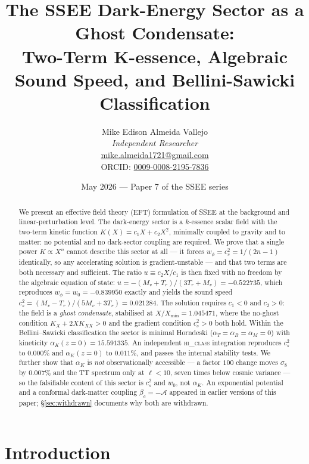 \documentclass[12pt,a4paper]{article}
\title{\textbf{The SSEE Dark-Energy Sector as a Ghost Condensate:\\
       Two-Term K-essence, Algebraic Sound Speed, and Bellini-Sawicki
       Classification}}
\author{Mike Edison Almeida Vallejo \\
\small \textit{Independent Researcher} \\
\small \href{mailto:mike.almeida1721@gmail.com}{mike.almeida1721@gmail.com} \\
\small ORCID: \href{https://orcid.org/0009-0008-2195-7836}{0009-0008-2195-7836}
}
\date{May 2026 --- Paper 7 of the SSEE series}
\newcommand{\AURA}{\mathcal{A}}
\newcommand{\bc}{\beta_c}
\begin{document}
\maketitle

\begin{abstract}
We present an effective field theory (EFT) formulation of SSEE at the
background and linear-perturbation level.
The dark-energy sector is a $k$-essence scalar field with the two-term
kinetic function $K(X) = c_1 X + c_2 X^2$, minimally coupled to gravity
and to matter: no potential and no dark-sector coupling are required.
We prove that a single power $K \propto X^n$ cannot describe this sector
at all --- it forces $w_\phi = c_s^2 = 1/(2n-1)$ identically, so any
accelerating solution is gradient-unstable --- and that two terms are
both necessary and sufficient.
The ratio $u \equiv c_2 X/c_1$ is then fixed with no freedom by the
algebraic equation of state: $u = -(M_v+T_r)/(3T_r+M_v) = -0.522735$,
which reproduces $w_\phi = w_0 = -0.839950$ exactly and yields the
sound speed $c_s^2 = (M_v-T_r)/(5M_v+3T_r) = 0.021284$.
The solution requires $c_1 < 0$ and $c_2 > 0$: the field is a
\emph{ghost condensate}, stabilised at $X/X_{\min} = 1.045471$, where
the no-ghost condition $K_X + 2XK_{XX} > 0$ and the gradient condition
$c_s^2 > 0$ both hold.
Within the Bellini--Sawicki classification the sector is minimal Horndeski
($\alpha_T = \alpha_B = \alpha_M = 0$) with kineticity
$\alpha_K(z{=}0) = 15.591335$.
An independent \textsc{hi\_class} integration reproduces $c_s^2$ to $0.000\%$
and $\alpha_K(z{=}0)$ to $0.011\%$, and passes the internal stability
tests.
We further show that $\alpha_K$ is \emph{not} observationally accessible ---
a factor $100$ change moves $\sigma_8$ by $0.007\%$ and the TT spectrum only
at $\ell < 10$, seven times below cosmic variance --- so the falsifiable
content of this sector is $c_s^2$ and $w_0$, not $\alpha_K$.
An exponential potential and a conformal dark-matter coupling
$\bc = -\AURA$ appeared in earlier versions of this paper; §\ref{sec:withdrawn}
documents why both are withdrawn.
\end{abstract}

\clearpage
{\small\tableofcontents}
\clearpage

\section{Introduction}
\label{sec:intro}
\end{document}
